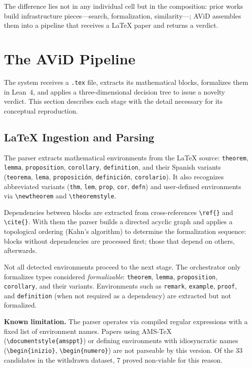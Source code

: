 \documentclass{article}
\theoremstyle{remark}
\begin{document}
The difference lies not in any individual cell but in the composition: prior works build infrastructure pieces---search, formalization, similarity---; AViD assembles them into a pipeline that receives a LaTeX paper and returns a verdict.


\section{The AViD Pipeline}

\label{sec:pipeline}

The system receives a \texttt{.tex} file, extracts its mathematical blocks, formalizes them in Lean~4, and applies a three-dimensional decision tree to issue a novelty verdict. This section describes each stage with the detail necessary for its conceptual reproduction.

\subsection{LaTeX Ingestion and Parsing}

The parser extracts mathematical environments from the LaTeX source: \texttt{theorem}, \texttt{lemma}, \texttt{proposition}, \texttt{corollary}, \texttt{definition}, and their Spanish variants (\texttt{teorema}, \texttt{lema}, \texttt{proposición}, \texttt{definición}, \texttt{corolario}). It also recognizes abbreviated variants (\texttt{thm}, \texttt{lem}, \texttt{prop}, \texttt{cor}, \texttt{defn}) and user-defined environments via \verb|\newtheorem| and \verb|\theoremstyle|.

Dependencies between blocks are extracted from cross-references \verb|\ref{}| and \verb|\cite{}|. With them the parser builds a directed acyclic graph and applies a topological ordering (Kahn's algorithm) to determine the formalization sequence: blocks without dependencies are processed first; those that depend on others, afterwards.

Not all detected environments proceed to the next stage. The orchestrator only formalizes types considered \textit{formalizable}: \texttt{theorem}, \texttt{lemma}, \texttt{proposition}, \texttt{corollary}, and their variants. Environments such as \texttt{remark}, \texttt{example}, \texttt{proof}, and \texttt{definition} (when not required as a dependency) are extracted but not formalized.

\textbf{Known limitation.} The parser operates via compiled regular expressions with a fixed list of environment names. Papers using AMS-\TeX{} (\verb|\documentstyle{amsppt}|) or defining environments with idiosyncratic names (\verb|\begin{inizio}|, \verb|\begin{numero}|) are not parseable by this version. Of the 33 candidates in the withdrawn dataset, 7 proved non-viable for this reason.
\end{document}
